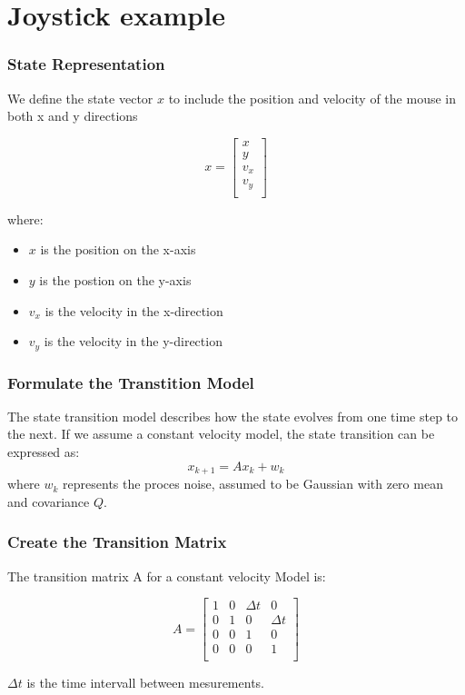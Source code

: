 \documentclass{beamer}
\begin{document}
\section{Joystick example}

\begin{frame}
    \frametitle{State Representation}
    We define the state vector \(x\) to include the position and velocity of the mouse in both x and y directions

    \begin{equation*}
        x = \begin{bmatrix}
            x     \\
            y     \\
            v_{x} \\
            v_{y} \\
        \end{bmatrix}
    \end{equation*}

    where:
    \begin{itemize}
        \item \(x\) is the position on the x-axis
        \item \(y\) is the postion on the y-axis
        \item \(v_{x}\) is the velocity in the x-direction
        \item \(v_{y}\) is the velocity in the y-direction

    \end{itemize}
\end{frame}

\begin{frame}
    \frametitle{Formulate the Transtition Model}
    The state transition model describes how the state evolves from one time step to the next.
    If we assume a constant velocity model, the state transition can be expressed as:
    \begin{equation*}
        x_{k+1}=Ax_{k}+w_{k}
    \end{equation*}
    where \(w_{k}\) represents the proces noise, assumed to be Gaussian with zero mean and covariance \(Q\).
\end{frame}

\begin{frame}
    \frametitle{Create the Transition Matrix}
    The transition matrix A for a constant velocity Model is:

    \begin{equation*}
        A = \begin{bmatrix}
            1 & 0 & \Delta t & 0        \\
            0 & 1 & 0        & \Delta t \\
            0 & 0 & 1        & 0        \\
            0 & 0 & 0        & 1        \\
        \end{bmatrix}
    \end{equation*}

    \(\Delta t\) is the time intervall between mesurements.
\end{frame}
\end{document}
